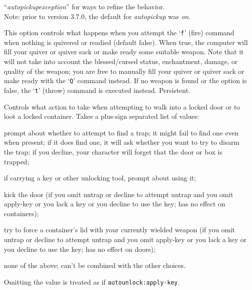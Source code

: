 \documentclass[titlepage]{article}
\begin{document}
\begin{description}[font=\mdseries\itshape]
``\textit{autopickup\textunderscore exception}'' for ways to refine the behavior.
\\
Note: prior to version 3.7.0, the default for \textit{autopickup} was \textit{on}.
\item[autoquiver]
This option controls what happens when you attempt the `\texttt{f}' (fire)
command when nothing is quivered or readied (default false).
When true, the computer will fill
your quiver or quiver sack or make ready some suitable weapon.
Note that it will not take
into account the blessed/cursed status, enchantment, damage, or
quality of the weapon; you are free to manually fill your quiver
or quiver sack or make ready
with the `\texttt{Q}' command instead.
If no weapon is found or the option is
false, the `\texttt{t}' (throw) command is executed instead.  Persistent.
\item[autounlock]
Controls what action to take when attempting to walk into a locked door
or to loot a locked container.
Takes a plus-sign separated list of values:
\newlength{\auwidth}
\addtolength{\auwidth}{\labelsep}
\begin{description}[leftmargin=\auwidth, topsep=1mm, itemsep=0mm, labelwidth=*, font=\ttfamily, align=right]
\item[Untrap]
prompt about whether to attempt to find a trap;
it might fail to find one even when present; if it does find one, it
will ask whether you want to try to disarm the trap; if you decline,
your character will forget that the door or box is trapped;
\item[Apply-Key]
if carrying a key or other unlocking tool, prompt about using it;
\item[Kick]
kick the door (if you omit untrap or decline to attempt untrap and
you omit apply-key or you lack a key or you decline to use the key;
has no effect on containers);
\item[Force]
try to force a container's lid with your currently
wielded weapon (if you omit untrap or decline to attempt untrap and
you omit apply-key or you lack a key or you decline to use the key;
has no effect on doors);
\item[None]
none of the above; can't be combined with the other choices.
\end{description}
Omitting the value is treated as if \texttt{autounlock:apply-key}.

\end{description}
\end{document}
